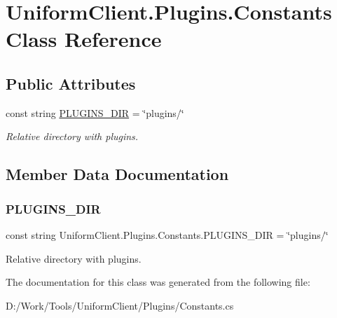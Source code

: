 \hypertarget{class_uniform_client_1_1_plugins_1_1_constants}{}\section{Uniform\+Client.\+Plugins.\+Constants Class Reference}
\label{class_uniform_client_1_1_plugins_1_1_constants}
\subsection*{Public Attributes}
\begin{DoxyCompactItemize}
\item 
const string \mbox{\hyperlink{class_uniform_client_1_1_plugins_1_1_constants_a7005abdb0c3ee5ba9e841769a7ecd575}{P\+L\+U\+G\+I\+N\+S\+\_\+\+D\+IR}} = \char`\"{}plugins/\char`\"{}
\begin{DoxyCompactList}\small\item\em Relative directory with plugins. \end{DoxyCompactList}\end{DoxyCompactItemize}


\subsection{Member Data Documentation}
\mbox{\label{class_uniform_client_1_1_plugins_1_1_constants_a7005abdb0c3ee5ba9e841769a7ecd575}} 
\subsubsection{\texorpdfstring{P\+L\+U\+G\+I\+N\+S\+\_\+\+D\+IR}{PLUGINS\_DIR}}
{\footnotesize\ttfamily const string Uniform\+Client.\+Plugins.\+Constants.\+P\+L\+U\+G\+I\+N\+S\+\_\+\+D\+IR = \char`\"{}plugins/\char`\"{}}



Relative directory with plugins. 



The documentation for this class was generated from the following file\+:\begin{DoxyCompactItemize}
\item 
D\+:/\+Work/\+Tools/\+Uniform\+Client/\+Plugins/Constants.\+cs\end{DoxyCompactItemize}
